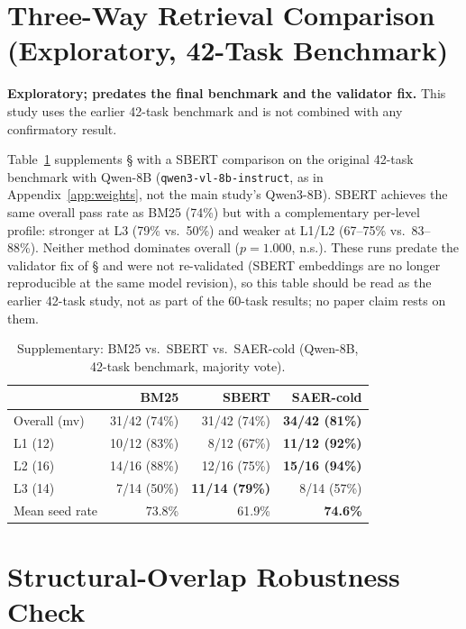 \documentclass[letterpaper]{article} %
\newcommand{\appref}[1]{Appendix~\ref{#1}}
\newcommand{\bodyref}[1]{\getrefnumber{#1}}
\begin{document}
\section{Three-Way Retrieval Comparison (Exploratory, 42-Task Benchmark)}
\label{app:threeway}

\noindent\textbf{Exploratory; predates the final benchmark and the
validator fix.}  This study uses the earlier 42-task benchmark and is
not combined with any confirmatory result.

Table~\ref{tab:3way} supplements \S\bodyref{sec:ricl} with a SBERT comparison on the
original 42-task benchmark with Qwen-8B (\texttt{qwen3-vl-8b-instruct}, as in
\appref{app:weights}, not the main study's Qwen3-8B).  SBERT achieves the same overall
pass rate as BM25 (74\%) but with a complementary per-level profile:
stronger at L3 (79\% vs.\ 50\%) and weaker at L1/L2 (67--75\% vs.\
83--88\%).  Neither method dominates overall ($p{=}1.000$, n.s.).
These runs predate the validator fix of \S\bodyref{sec:protocol} and were not
re-validated (SBERT embeddings are no longer reproducible at the same
model revision), so this table should be read as the earlier 42-task
study, not as part of the
60-task results; no paper claim rests on them.

\begin{table}[tbp]
\centering
\caption{Supplementary: BM25 vs.\ SBERT vs.\ SAER-cold
(Qwen-8B, 42-task benchmark, majority vote).}
\label{tab:3way}
\small
\begin{tabular}{lrrr}
\toprule
 & BM25 & SBERT & SAER-cold \\
\midrule
Overall (mv)   & 31/42 (74\%) & 31/42 (74\%) & \textbf{34/42 (81\%)} \\
L1 (12)        & 10/12 (83\%) & 8/12 (67\%)  & \textbf{11/12 (92\%)} \\
L2 (16)        & 14/16 (88\%) & 12/16 (75\%) & \textbf{15/16 (94\%)} \\
L3 (14)        & 7/14 (50\%)  & \textbf{11/14 (79\%)} & 8/14 (57\%) \\
Mean seed rate & 73.8\%       & 61.9\%        & \textbf{74.6\%} \\
\bottomrule
\end{tabular}
\end{table}

\section{Structural-Overlap Robustness Check}
\label{app:overlap}
\label{app:overlap-robustness}
\end{document}
